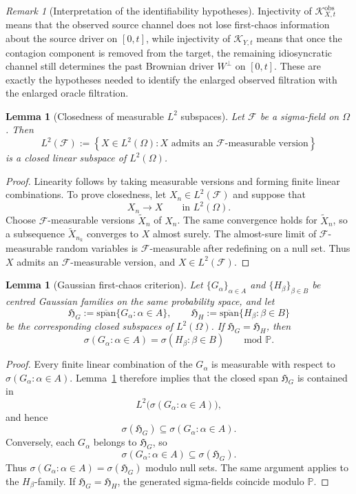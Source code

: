\documentclass[11pt,a4paper]{amsart}
\theoremstyle{plain}
\newtheorem{lemma}[theorem]{Lemma}
\theoremstyle{definition}
\theoremstyle{remark}
\newtheorem{remark}[theorem]{Remark}
\newcommand{\PP}{\mathbb{P}}
\begin{document}
\begin{remark}[Interpretation of the identifiability hypotheses]
Injectivity of $\mathcal K_{X,t}^{\mathrm{obs}}$ means that the observed source channel
does not lose first-chaos information about the source driver on $[0,t]$, while
injectivity of $\mathcal K_{Y,t}$ means that once the contagion component is removed from
the target, the remaining idiosyncratic channel still determines the past Brownian driver
$W^\perp$ on $[0,t]$. These are exactly the hypotheses needed to identify the enlarged
observed filtration with the enlarged oracle filtration.
\end{remark}

\begin{lemma}[Closedness of measurable $L^2$ subspaces]\label{lem:L2meas}
Let $\mathcal F$ be a sigma-field on $\Omega$. Then
\[
L^2(\mathcal F)
:=
\left\{
X\in L^2(\Omega): X \text{ admits an }\mathcal F\text{-measurable version}
\right\}
\]
is a closed linear subspace of $L^2(\Omega)$.
\end{lemma}

\begin{proof}
Linearity follows by taking measurable versions and forming finite linear combinations.  To prove
closedness, let \(X_n\in L^2(\mathcal F)\) and suppose that
\[
X_n\to X
\qquad\text{in }L^2(\Omega).
\]
Choose \(\mathcal F\)-measurable versions \(\widetilde X_n\) of \(X_n\).  The same convergence holds
for \(\widetilde X_n\), so a subsequence \(\widetilde X_{n_k}\) converges to \(X\) almost surely.
The almost-sure limit of \(\mathcal F\)-measurable random variables is \(\mathcal F\)-measurable
after redefining on a null set.  Thus \(X\) admits an \(\mathcal F\)-measurable version, and
\(X\in L^2(\mathcal F)\).
\end{proof}

\begin{lemma}[Gaussian first-chaos criterion]\label{lem:first-chaos}
Let $\{G_\alpha\}_{\alpha\in A}$ and $\{H_\beta\}_{\beta\in B}$ be centred Gaussian
families on the same probability space, and let
\[
\mathfrak H_G:=\overline{\mathrm{span}}\{G_\alpha:\alpha\in A\},
\qquad
\mathfrak H_H:=\overline{\mathrm{span}}\{H_\beta:\beta\in B\}
\]
be the corresponding closed subspaces of $L^2(\Omega)$. If $\mathfrak H_G=\mathfrak H_H$,
then
\[
\sigma(G_\alpha:\alpha\in A)=\sigma(H_\beta:\beta\in B)
\qquad\text{mod }\PP.
\]
\end{lemma}

\begin{proof}
Every finite linear combination of the \(G_\alpha\) is measurable with respect to
\(\sigma(G_\alpha:\alpha\in A)\).  Lemma~\ref{lem:L2meas} therefore implies that the closed span
\(\mathfrak H_G\) is contained in
\[
L^2\bigl(\sigma(G_\alpha:\alpha\in A)\bigr),
\]
and hence
\[
\sigma(\mathfrak H_G)\subseteq \sigma(G_\alpha:\alpha\in A).
\]
Conversely, each \(G_\alpha\) belongs to \(\mathfrak H_G\), so
\[
\sigma(G_\alpha:\alpha\in A)\subseteq \sigma(\mathfrak H_G).
\]
Thus \(\sigma(G_\alpha:\alpha\in A)=\sigma(\mathfrak H_G)\) modulo null sets.  The same
argument applies to the \(H_\beta\)-family.  If \(\mathfrak H_G=\mathfrak H_H\), the generated
sigma-fields coincide modulo \(\PP\).
\end{proof}
\end{document}
